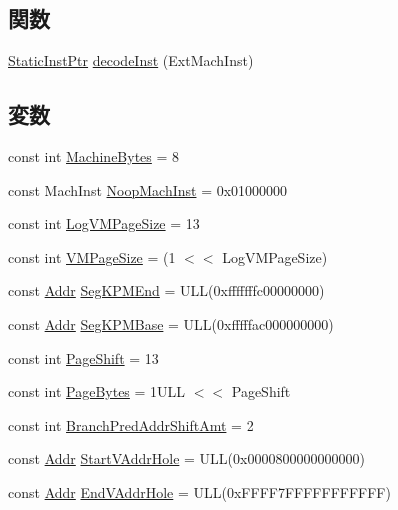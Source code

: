 \subsection*{関数}
\begin{DoxyCompactItemize}
\item 
\hyperlink{classRefCountingPtr}{StaticInstPtr} \hyperlink{namespaceSparcISA_aaf291bfb6ea39d0d8b0c369307f2eb92}{decodeInst} (ExtMachInst)
\end{DoxyCompactItemize}
\subsection*{変数}
\begin{DoxyCompactItemize}
\item 
const int \hyperlink{namespaceSparcISA_a8f4ba87c53caab23396d3b86b672b0fb}{MachineBytes} = 8
\item 
const MachInst \hyperlink{namespaceSparcISA_a636df3d1cbf44a747182aa98c4f89429}{NoopMachInst} = 0x01000000
\item 
const int \hyperlink{namespaceSparcISA_a554fef169d109a5ccb7ce0dd6a43e521}{LogVMPageSize} = 13
\item 
const int \hyperlink{namespaceSparcISA_a891eaf95159d764e6efae501c2860a3a}{VMPageSize} = (1 $<$$<$ LogVMPageSize)
\item 
const \hyperlink{base_2types_8hh_af1bb03d6a4ee096394a6749f0a169232}{Addr} \hyperlink{namespaceSparcISA_a63fc50b3e99f87e3eb05f5a8bd473ea4}{SegKPMEnd} = ULL(0xfffffffc00000000)
\item 
const \hyperlink{base_2types_8hh_af1bb03d6a4ee096394a6749f0a169232}{Addr} \hyperlink{namespaceSparcISA_a1b6320d4c0e7fb8b5cf9f28cef6681e0}{SegKPMBase} = ULL(0xfffffac000000000)
\item 
const int \hyperlink{namespaceSparcISA_a500ead3838797254da115aeeff14aaa5}{PageShift} = 13
\item 
const int \hyperlink{namespaceSparcISA_a7a804a2139c455999786dede70a4467b}{PageBytes} = 1ULL $<$$<$ PageShift
\item 
const int \hyperlink{namespaceSparcISA_a518c446960e93d236b89246eabc20298}{BranchPredAddrShiftAmt} = 2
\item 
const \hyperlink{base_2types_8hh_af1bb03d6a4ee096394a6749f0a169232}{Addr} \hyperlink{namespaceSparcISA_ab232c3f77d12da8f20157152adc977bd}{StartVAddrHole} = ULL(0x0000800000000000)
\item 
const \hyperlink{base_2types_8hh_af1bb03d6a4ee096394a6749f0a169232}{Addr} \hyperlink{namespaceSparcISA_a4d93696a5ef64a474d95daebd255181b}{EndVAddrHole} = ULL(0xFFFF7FFFFFFFFFFF)

\end{DoxyCompactItemize}
